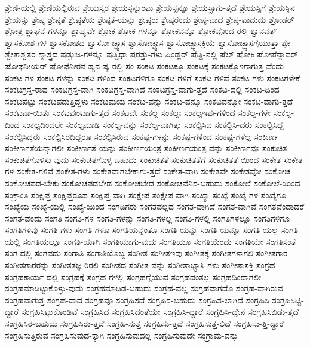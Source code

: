 {ಶ್ರೇಣಿ-ಯಲ್ಲಿ
ಶ್ರೇಣಿಯಲ್ಲಿರುವ
ಶ್ರೇಯಸ್ಕರ
ಶ್ರೇಯಸ್ಸನ್ನುಂಟು
ಶ್ರೇಯಸ್ಸನ್ನೂ
ಶ್ರೇಯಸ್ಸಾಗು-ತ್ತದೆ
ಶ್ರೇಯಸ್ಸಿಗೆ
ಶ್ರೇಯಸ್ಸಿನ
ಶ್ರೇಯಸ್ಸು
ಶ್ರೇಷ್ಠ
ಶ್ರೇಷ್ಠತೆ
ಶ್ರೇಷ್ಠತೆಯ
ಶ್ರೇಷ್ಠತೆ-ಯನ್ನು
ಶ್ರೇಷ್ಠರು
ಶ್ರೇಷ್ಠರೆಂದು
ಶ್ರೇಷ್ಠ-ವಾದ
ಶ್ರೇಷ್ಠ-ವಾದುದು
ಶ್ರೋಡರ್
ಶ್ರೋತ್ರ
ಶ್ಲಾಘನೆ-ಗಳನ್ನೂ
ಶ್ಲಾಘ್ಯವೇ
ಶ್ಲೋಕ
ಶ್ಲೋಕ-ಗಳನ್ನೂ
ಶ್ಲೋಕವನ್ನೊ
ಶ್ಲೋಕವೊಂದ-ರಲ್ಲಿ
ಶ್ವಾನವತ್
ಶ್ವಾಸಕೋಶ-ಗಳ
ಶ್ವಾಸಕೋಶದ
ಶ್ವಾಸೋ-ಚ್ಛ್ವಾಸ
ಶ್ವಾಸೋಚ್ಛ್ವಾಸ
ಶ್ವಾಸೋಚ್ಛ್ವಾಸಕ್ರಿಯೆ
ಶ್ವಾಸೋಚ್ಛ್ವಾಸಗೈಯುತ್ತಾ
ಶ್ವೇ
ಶ್ವೇತಾಶ್ವತರ
ಶ್ಶಾಸ್ತ್ರದ
ಷಡ್ಭುಜ-ಗಳನ್ನೂ
ಷಡ್ವಿಧಾ
ಷರತ್ತು-ಗಳು
ಷಿಂಡ್ಲರ್
ಷೆಡ್ಡಿ-ನಲ್ಲಿ
ಷೆಲ್
ಷೋಕಿ
ಷೋಪೆನ್ಹಾವರ್
ಷೋಫನೀಯರ್
ಷೋಫೆನೀರನ
ಷ್ಯನ
ಷ್ಯ-ರಲ್ಲಿ
ಸಂ
ಸಂಕಟ
ಸಂಕಟಕ್ಕೂ
ಸಂಕಟಕ್ಕೆ
ಸಂಕಟಕ್ಕೊಳಗಾಗುತ್ತ-ವೆಂದು
ಸಂಕಟ-ಗಳ
ಸಂಕಟ-ಗಳನ್ನು
ಸಂಕಟ-ಗಳಿಂದ
ಸಂಕಟಗಳಿಗೂ
ಸಂಕಟ-ಗಳಿಗೆ
ಸಂಕಟ-ಗಳಿವೆ
ಸಂಕಟ-ಗಳು
ಸಂಕಟಗಳೇಕೆ
ಸಂಕಟಗ್ರಸ್ತ-ರಾದ
ಸಂಕಟಗ್ರಸ್ತ-ವಾಗಿ
ಸಂಕಟಗ್ರಸ್ತ-ವಾಗಿದೆ
ಸಂಕಟಗ್ರಸ್ತ-ವಾಗು-ತ್ತದೆ
ಸಂಕಟ-ದಲ್ಲಿ
ಸಂಕಟ-ದಿಂದ
ಸಂಕಟಪಟ್ಟು
ಸಂಕಟಪಡುತ್ತಿದ್ದಳು
ಸಂಕಟಮಯ
ಸಂಕಟ-ವನ್ನು
ಸಂಕಟ-ವನ್ನೂ
ಸಂಕಟವನ್ನೋ
ಸಂಕಟ-ವಾಗು-ತ್ತದೆ
ಸಂಕಟವಾ-ಯಿತು
ಸಂಕಟವುಂಟಾಗು-ತ್ತದೆ
ಸಂಕಟವೇ
ಸಂಕಲ್ಪ
ಸಂಕಲ್ಪಃ
ಸಂಕಲ್ಪಇವು-ಗಳಿಂದ
ಸಂಕಲ್ಪ-ಗಳೇ
ಸಂಕಲ್ಪ-ದಿಂದ
ಸಂಕಲ್ಪದಿಂದಲೇ
ಸಂಕಲ್ಪಮಾಡಿ
ಸಂಕಲ್ಪ-ವನ್ನು
ಸಂಕಲ್ಪ-ವಾಗಿತ್ತು
ಸಂಕಲ್ಪಿಸಿದ
ಸಂಕಲ್ಪಿಸಿ-ದರು
ಸಂಕಲ್ಪಿಸಿದ್ದ
ಸಂಕಲ್ಪಿಸಿದ್ದರು
ಸಂಕಲ್ಪಿಸಿರದಿದ್ದರೂ
ಸಂಕಲ್ಪಿಸಿರುವ
ಸಂಕಷ್ಟ-ಗಳನ್ನು
ಸಂಕಷ್ಟ-ಗಳಿಂದ
ಸಂಕಷ್ಟ-ಗಳೆಲ್ಲ
ಸಂಕೀರ್ಣ
ಸಂಕೀರ್ಣತೆಯನ್ನಾಗಲೀ
ಸಂಕೀರ್ಣತೆ-ಯನ್ನು
ಸಂಕೀರ್ಣಯಂತ್ರ
ಸಂಕೀರ್ಣಯಂತ್ರ-ವನ್ನು
ಸಂಕೀರ್ಣವೂ
ಸಂಕುಚಿತ
ಸಂಕುಚಿತಗೊಳಿಸು-ವುದು
ಸಂಕುಚಿತಗೊಳ್ಳ-ಬಹುದು
ಸಂಕುಚಿತತೆ
ಸಂಕುಚಿತತೆಗೆ
ಸಂಕುಚಿತತೆ-ಯಿಂದ
ಸಂಕೇತ
ಸಂಕೇತ-ಗಳ
ಸಂಕೇತ-ಗಳಿವೆ
ಸಂಕೇತ-ಗಳು
ಸಂಕೇತವಾಗಬೇಕಾಗು-ತ್ತದೆ
ಸಂಕೇತ-ವಾಗಿ
ಸಂಕೇತವೇ
ಸಂಕೇತವೋ
ಸಂಕೋಚ
ಸಂಕೋಚಪಡ-ಬೇಕು
ಸಂಕೋಚಪಡಬೇಡ
ಸಂಕೋಚಬೇಡ
ಸಂಕೋಚವೆನಿಸ-ಬಹುದು
ಸಂಕೋಲೆ
ಸಂಕೋಲೆ-ಯಿಂದ
ಸಂಕ್ರಾಂತಿ
ಸಂಕ್ಷಿಪ್ತ
ಸಂಕ್ಷಿಪ್ತರೂಪ
ಸಂಕ್ಷಿಪ್ತ-ವಾಗಿ
ಸಂಕ್ಷೇಪ
ಸಂಕ್ಷೇಪ-ವಾಗಿ
ಸಂಖ್ಯಾ
ಸಂಖ್ಯೆ
ಸಂಖ್ಯೆ-ಗಳ
ಸಂಖ್ಯೆಗೂ
ಸಂಖ್ಯೆಯ
ಸಂಖ್ಯೆ-ಯಲ್ಲಿ
ಸಂಖ್ಯೆ-ಯಿಂದ
ಸಂಗಡಿಗರು
ಸಂಗತವಲ್ಲದ
ಸಂಗತ-ವಾಗಿದೆ
ಸಂಗತ-ವಾಗಿವೆ
ಸಂಗತವೆಂದಾದರೆ
ಸಂಗತ-ವೆಂದು
ಸಂಗತಿ
ಸಂಗತಿ-ಗಳ
ಸಂಗತಿ-ಗಳನ್ನು
ಸಂಗತಿ-ಗಳಲ್ಲ
ಸಂಗತಿ-ಗಳಲ್ಲಿ
ಸಂಗತಿಗಳಲ್ಲೂ
ಸಂಗತಿಗಳಿಗೂ
ಸಂಗತಿಗಳಿವು
ಸಂಗತಿ-ಗಳು
ಸಂಗತಿ-ಗಳೂ
ಸಂಗತಿಯನ್ನಂತೂ
ಸಂಗತಿ-ಯನ್ನು
ಸಂಗತಿ-ಯನ್ನೂ
ಸಂಗತಿ-ಯಲ್ಲ
ಸಂಗತಿ-ಯಲ್ಲಿ
ಸಂಗತಿಯಲ್ಲೂ
ಸಂಗತಿ-ಯಾಗಿ
ಸಂಗತಿಯಾಗು-ವುದು
ಸಂಗತಿಯೂ
ಸಂಗತಿಯೆಂದು
ಸಂಗತಿಯೇ
ಸಂಗತಿಸಂತೆ
ಸಂಗ-ದಲ್ಲಿ
ಸಂಗವದು
ಸಂಗಾತಿ
ಸಂಗಾತಿಯೊಬ್ಬ
ಸಂಗೀತ
ಸಂಗೀತಇವು
ಸಂಗೀತಕ್ಕೆ
ಸಂಗೀತಗಳಾಗಲಿ
ಸಂಗೀತಗಾರ
ಸಂಗೀತಗಾರರನ್ನು
ಸಂಗೀತತಜ್ಞ-ರಿರಲಿ
ಸಂಗೀತದ
ಸಂಗೀತ-ವನ್ನು
ಸಂಗೀತಾಭ್ಯಾಸಿ-ಗಳು
ಸಂಗೀತಾಸಕ್ತಿ
ಸಂಗ್ರಹ
ಸಂಗ್ರಹಕಾರ್ಯ-ದಲ್ಲಿ
ಸಂಗ್ರಹಕ್ಕೆ
ಸಂಗ್ರಹ-ಗಳಲ್ಲಿ
ಸಂಗ್ರಹಗೈಯುವ
ಸಂಗ್ರಹದಂತಲ್ಲ
ಸಂಗ್ರಹದಿಂದಾಗಲೀ
ಸಂಗ್ರಹಮಾಡಿಟ್ಟುಕೊಳ್ಳು-ವುದು
ಸಂಗ್ರಹಮಾಡಿಡ-ಬಹುದು
ಸಂಗ್ರಹ-ವಲ್ಲ
ಸಂಗ್ರಹವಾಗದೊ
ಸಂಗ್ರಹ-ವಾಗಿರುವ
ಸಂಗ್ರಹವಾಗುತ್ತ
ಸಂಗ್ರಹ-ವಾದ
ಸಂಗ್ರಹವೂ
ಸಂಗ್ರಹಿಸದೆ
ಸಂಗ್ರಹಿಸ-ಬಹುದು
ಸಂಗ್ರಹಿಸ-ಲಾಗಿದೆ
ಸಂಗ್ರಹಿಸಿ
ಸಂಗ್ರಹಿಸಿಟ್ಟಿ-ದ್ದಾರೆ
ಸಂಗ್ರಹಿಸಿಟ್ಟುಕೊಂಡಿವೆ
ಸಂಗ್ರಹಿಸಿದ
ಸಂಗ್ರಹಿಸಿದಂತೆಯೇ
ಸಂಗ್ರಹಿಸಿ-ದ್ದಾರೆ
ಸಂಗ್ರಹಿಸಿ-ದ್ದೇನೆ
ಸಂಗ್ರಹಿಸಿಬಿಡು-ತ್ತದೆ
ಸಂಗ್ರಹಿಸಿರ-ಬಹುದು
ಸಂಗ್ರಹಿಸಿರು-ತ್ತದೆ
ಸಂಗ್ರಹಿ-ಸುತ್ತ
ಸಂಗ್ರಹಿಸು-ತ್ತದೆ
ಸಂಗ್ರಹಿಸುತ್ತ-ಲಿದೆ
ಸಂಗ್ರಹಿಸು-ತ್ತಿ-ದ್ದಾರೆ
ಸಂಗ್ರಹಿಸುತ್ತಿರುವ
ಸಂಗ್ರಹಿಸುವುದ-ಕ್ಕಾಗಿ
ಸಂಗ್ರಹಿಸುವುದಲ್ಲ
ಸಂಗ್ರಹಿಸುವುದೇ
ಸಂಗ್ರಾಮ-ವನ್ನು
}
